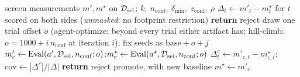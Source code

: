 \begin{algorithm}[h]
\caption{Promotion rule P for candidate $\artifact'$ against incumbent $\artifact^\star$.}
\label{alg:P}
\begin{algorithmic}[1]
\REQUIRE screen measurements $m',m^\star$ on $\mathcal{D}_{\mathrm{sel}}$; $k,\ n_{\mathrm{conf}},\ \delta_{\min},\ z_{\mathrm{conf}},\ \rho$
\STATE $\Delta_t\gets m'_t-m^\star_t$ for $t$ scored on both sides (\emph{unmasked}: no footprint restriction)
 \STATE \textbf{return} reject \ENDIF
\STATE draw one trial offset $o$ (agent-optimize: beyond every trial either artifact has; hill-climb: $o=1000+i\,n_{\mathrm{conf}}$ at iteration $i$); fix seeds as $\mathrm{base}+o+j$
\STATE $m'_{\mathrm{c}}\gets \mathrm{Eval}(a',\mathcal{D}_{\mathrm{sel}},n_{\mathrm{conf}};o)$;\quad $m^\star_{\mathrm{c}}\gets \mathrm{Eval}(a^\star,\mathcal{D}_{\mathrm{sel}},n_{\mathrm{conf}};o)$
\STATE $\Delta^{c}_t\gets m'_{\mathrm{c},t}-m^\star_{\mathrm{c},t}$;\quad $\mathrm{cov}\gets |\Delta^{c}|/|\Delta|$
 \STATE \textbf{return} reject \ENDIF
\RETURN promote, with new baseline $m^\star\gets m'_{\mathrm{c}}$
\end{algorithmic}
\end{algorithm}
